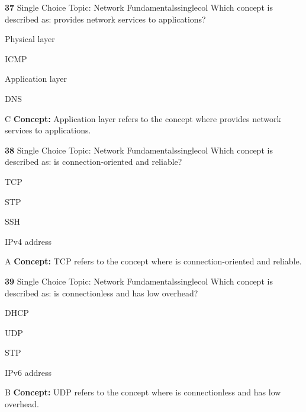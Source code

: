 \documentclass[10pt,a4paper]{article}
\begin{document}
\begin{qcard}{\color{white}\textbf{37} \hfill \small Single Choice \textbar{} Topic: Network Fundamentals}{singlecol}
Which concept is described as: provides network services to applications?

\begin{qoptions}
\item Physical layer
\item ICMP
\item Application layer
\item DNS
\end{qoptions}
\begin{explainbox}{C}
\textbf{Concept:} Application layer refers to the concept where provides network services to applications.
\end{explainbox}
\end{qcard}

\begin{qcard}{\color{white}\textbf{38} \hfill \small Single Choice \textbar{} Topic: Network Fundamentals}{singlecol}
Which concept is described as: is connection-oriented and reliable?

\begin{qoptions}
\item TCP
\item STP
\item SSH
\item IPv4 address
\end{qoptions}
\begin{explainbox}{A}
\textbf{Concept:} TCP refers to the concept where is connection-oriented and reliable.
\end{explainbox}
\end{qcard}

\begin{qcard}{\color{white}\textbf{39} \hfill \small Single Choice \textbar{} Topic: Network Fundamentals}{singlecol}
Which concept is described as: is connectionless and has low overhead?

\begin{qoptions}
\item DHCP
\item UDP
\item STP
\item IPv6 address
\end{qoptions}
\begin{explainbox}{B}
\textbf{Concept:} UDP refers to the concept where is connectionless and has low overhead.
\end{explainbox}
\end{qcard}
\end{document}
